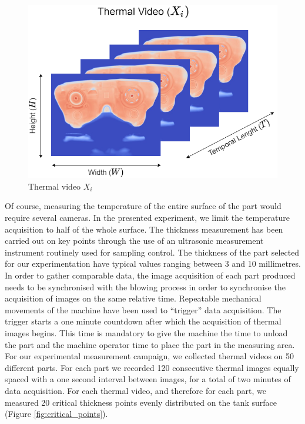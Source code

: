 \begin{figure}
\centering
\includegraphics[scale=0.55]{images/chapter_4/Thermal_video.png}
\caption{Thermal video $X_i$}
\label{fig:thermal_video}
\end{figure}

Of course, measuring the temperature of the entire surface of the part would require several cameras. In the presented experiment, we limit the temperature acquisition to half of the whole surface. The thickness measurement has been carried out on key points through the use of an ultrasonic measurement instrument routinely used for sampling control. The thickness of the part selected for our experimentation have typical values ranging between 3 and 10 millimetres. In order to gather comparable data, the image acquisition of each part produced needs to be synchronised with the blowing process in order to synchronise the  acquisition of images on the same relative time. Repeatable mechanical movements of the machine have been used to “trigger” data acquisition. The trigger starts a one minute countdown after which the acquisition of thermal images begins. This time is mandatory to give the machine the time to unload the part and the machine operator time to place the part in the measuring area. For our experimental measurement campaign, we collected thermal videos on 50 different parts. For each part we recorded 120 consecutive thermal images equally spaced with a one second interval between images, for a total of two minutes of data acquisition. For each thermal video, and therefore for each part, we measured 20 critical thickness points evenly distributed on the tank surface (Figure \ref{fig:critical_points}).

